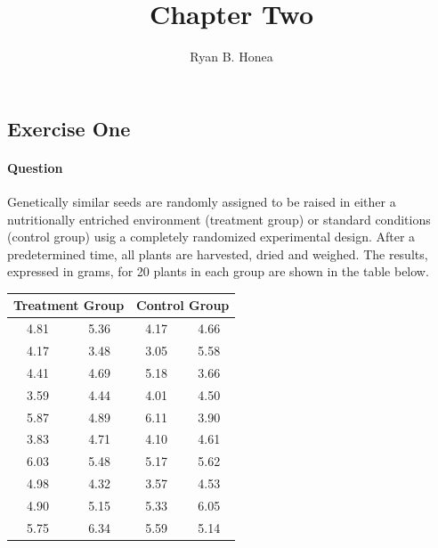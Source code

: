 \documentclass[]{article}
\title{Chapter Two}
\author{Ryan B. Honea}
\date{}
\let\oldparagraph\paragraph
\renewcommand{\paragraph}[1]{\oldparagraph{#1}\mbox{}}
\begin{document}
\maketitle

\subsection{Exercise One}\label{exercise-one}

\paragraph{Question}\label{question}

Genetically similar seeds are randomly assigned to be raised in either a
nutritionally entriched environment (treatment group) or standard
conditions (control group) usig a completely randomized experimental
design. After a predetermined time, all plants are harvested, dried and
weighed. The results, expressed in grams, for 20 plants in each group
are shown in the table below.

\begin{center}
\begin{tabular}{@{}cccc@{}}
\toprule
\multicolumn{2}{c}{Treatment Group} & \multicolumn{2}{c}{Control Group} \\ \midrule
4.81             & 5.36             & 4.17            & 4.66            \\
4.17             & 3.48             & 3.05            & 5.58            \\
4.41             & 4.69             & 5.18            & 3.66            \\
3.59             & 4.44             & 4.01            & 4.50            \\
5.87             & 4.89             & 6.11            & 3.90            \\
3.83             & 4.71             & 4.10            & 4.61            \\
6.03             & 5.48             & 5.17            & 5.62            \\
4.98             & 4.32             & 3.57            & 4.53            \\
4.90             & 5.15             & 5.33            & 6.05            \\
5.75             & 6.34             & 5.59            & 5.14            \\ \bottomrule
\end{tabular}
\end{center}
\end{document}
